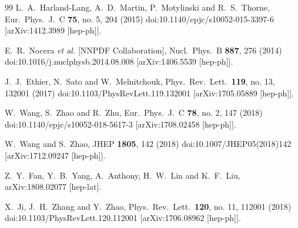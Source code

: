 \begin{thebibliography}{99}
  L.~A.~Harland-Lang, A.~D.~Martin, P.~Motylinski and R.~S.~Thorne,
  Eur.\ Phys.\ J.\ C {\bf 75}, no. 5, 204 (2015)
  doi:10.1140/epjc/s10052-015-3397-6
  [arXiv:1412.3989 [hep-ph]].


  E.~R.~Nocera {\it et al.} [NNPDF Collaboration],
  Nucl.\ Phys.\ B {\bf 887}, 276 (2014)
  doi:10.1016/j.nuclphysb.2014.08.008
  [arXiv:1406.5539 [hep-ph]].


  J.~J.~Ethier, N.~Sato and W.~Melnitchouk,
  Phys.\ Rev.\ Lett.\  {\bf 119}, no. 13, 132001 (2017)
  doi:10.1103/PhysRevLett.119.132001
  [arXiv:1705.05889 [hep-ph]].


  W.~Wang, S.~Zhao and R.~Zhu,
  Eur.\ Phys.\ J.\ C {\bf 78}, no. 2, 147 (2018)
  doi:10.1140/epjc/s10052-018-5617-3
  [arXiv:1708.02458 [hep-ph]].


  W.~Wang and S.~Zhao,
  JHEP {\bf 1805}, 142 (2018)
  doi:10.1007/JHEP05(2018)142
  [arXiv:1712.09247 [hep-ph]].


  Z.~Y.~Fan, Y.~B.~Yang, A.~Anthony, H.~W.~Lin and K.~F.~Liu,
  arXiv:1808.02077 [hep-lat].

  X.~Ji, J.~H.~Zhang and Y.~Zhao,
  Phys.\ Rev.\ Lett.\  {\bf 120}, no. 11, 112001 (2018)
  doi:10.1103/PhysRevLett.120.112001
  [arXiv:1706.08962 [hep-ph]].



\end{thebibliography}
